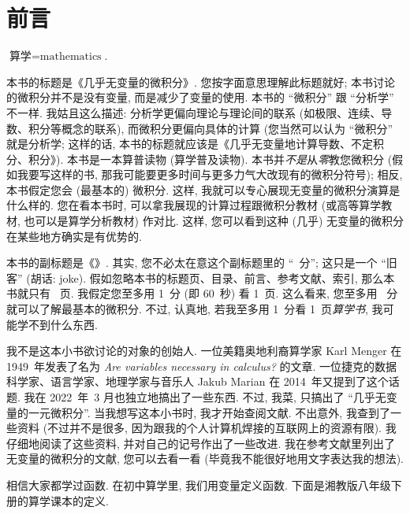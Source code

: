 \chapter*{前言}

\begin{definition*}
    $\text{算学} = \text{mathematics}$.
\end{definition*}

本书的标题是《几乎无变量的微积分》. 您按字面意思理解此标题就好; 本书讨论的微积分并不是没有变量, 而是减少了变量的使用. 本书的 ``微积分'' 跟 ``分析学'' 不一样. 我姑且这么描述: 分析学更偏向理论与理论间的联系 (如极限、连续、导数、积分等概念的联系), 而微积分更偏向具体的计算 (您当然可以认为 ``微积分'' 就是分析学; 这样的话, 本书的标题就应该是《几乎无变量地计算导数、不定积分、积分》). 本书是一本算普读物 (算学普及读物). 本书并\emph{不是}从\emph{零}教您微积分 (假如我要写这样的书, 那我可能要更多时间与更多力气大改现有的微积分符号); 相反, 本书假定您会 (最基本的) 微积分. 这样, 我就可以专心展现无变量的微积分演算是什么样的. 您在看本书时, 可以拿我展现的计算过程跟微积分教材 (或高等算学教材, 也可以是算学分析教材) 作对比. 这样, 您可以看到这种 (几乎) 无变量的微积分在某些地方确实是有优势的.

本书的副标题是《\CalculusSubtitle 》. 其实, 您不必太在意这个副标题里的 ``\pageref{calculus:LastPage}~分''; 这只是一个 ``旧客'' (胡话: joke). 假如忽略本书的标题页、目录、前言、参考文献、索引, 那么本书就只有 \pageref{calculus:LastPage}~页. 我假定您至多用 1~分 (即 60~秒) 看 1~页. 这么看来, 您至多用 \pageref{calculus:LastPage}~分就可以了解最基本的微积分. 不过, 认真地, 若我至多用 1~分看 1~页\emph{算学书}, 我可能学不到什么东西.

我不是这本小书欲讨论的对象的创始人. 一位美籍奥地利裔算学家 Karl Menger 在 1949~年发表了名为 \textit{Are variables necessary in calculus?} 的文章. 一位捷克的数据科学家、语言学家、地理学家与音乐人 Jakub Marian 在 2014~年又提到了这个话题. 我在 2022~年~3 月也独立地搞出了一些东西. 不过, 我菜, 只搞出了 ``几乎无变量的一元微积分''. 当我想写这本小书时, 我才开始查阅文献. 不出意外, 我查到了一些资料 (不过并不是很多, 因为跟我的个人计算机焊接的互联网上的资源有限). 我仔细地阅读了这些资料, 并对自己的记号作出了一些改进. 我在参考文献里列出了无变量的微积分的文献, 您可以去看一看 (毕竟我不能很好地用文字表达我的想法).

相信大家都学过函数. 在初中算学里, 我们用变量定义函数. 下面是湘教版八年级下册的算学课本的定义.

